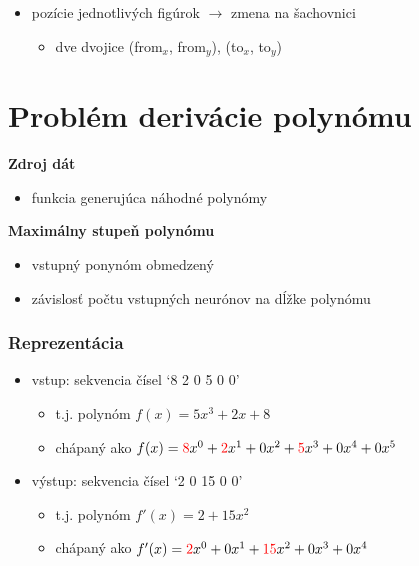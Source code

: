 \documentclass[red]{beamer}
\begin{document}
\begin{frame}
\begin{center}
\begin{itemize}
\item pozície jednotlivých figúrok $ \rightarrow $ zmena na šachovnici

\begin{itemize}
\item dve dvojice (from$_x$, from$_y$), (to$_x$, to$_y$)
\end{itemize}

\end{itemize}
\end{center}
\end{frame}

\section{Problém derivácie polynómu}

\begin{frame}
\begin{center}
\hspace*{0.5cm}\begin{minipage}{\textwidth}
\textbf{Zdroj dát}
\begin{itemize}
\item funkcia generujúca náhodné polynómy
\end{itemize}
\textbf{Maximálny stupeň polynómu}
\begin{itemize}
\item vstupný ponynóm obmedzený
\item závislosť počtu vstupných neurónov na dĺžke polynómu
\end{itemize}
\end{minipage}
\end{center} 
\end{frame}

\begin{frame}
\begin{center}
\frametitle{Reprezentácia}
\begin{itemize}
\item vstup: sekvencia čísel `8 2 0 5 0 0'
\begin{itemize}
\item t.j. polynóm $f(x)=5x^3 + 2x + 8$
\item chápaný ako $f(x)= {\color{red} 8} x^0 + {\color{red} 2}x^1 + 0x^2 + {\color{red} 5}x^3 + 0x^4 + 0x^5$
\end{itemize}

\vspace*{1cm}

\item výstup: sekvencia čísel `2 0 15 0 0'
\begin{itemize}
\item t.j. polynóm $f'(x)=2 + 15x^2$
\item chápaný ako $f'(x)={\color{red} 2}x^0 + 0x^1 + {\color{red} 15}x^2 + 0x^3 + 0x^4$
\end{itemize}
\end{itemize}
\end{center} 
\end{frame}
\end{document}
